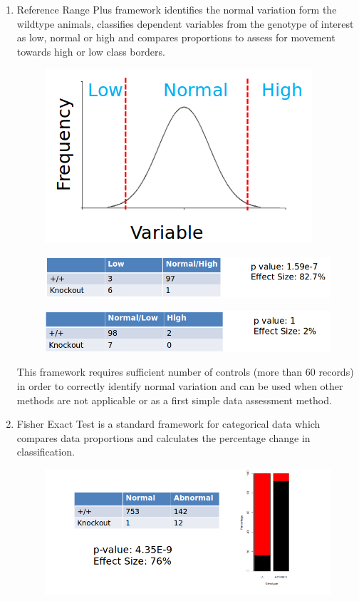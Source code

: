 \documentclass[12pt,a4paper]{article}
\begin{document}
\begin{enumerate}
\item Reference Range Plus framework identifies the normal variation form the wildtype animals, classifies dependent variables from the genotype of interest as low, normal or high and compares proportions to assess for movement towards high or low class borders.  
\begin{figure}[H]%
\centerline{\includegraphics[scale=0.4]{RR1_simple.png}}
\end{figure} 
\begin{figure}[H]%
\centerline{\includegraphics[scale=0.4]{RR2_1_simple.png}}
\end{figure}
\begin{figure}[H]%
\centerline{\includegraphics[scale=0.4]{RR2_2_simple.png}}
\end{figure}

This framework requires sufficient number of controls (more than 60 records) in order to correctly identify normal variation and can be used when other methods are not applicable or as a first simple data assessment method. 
\item Fisher Exact Test is a standard framework for categorical data which compares data proportions and calculates the percentage change in classification.
\begin{figure}[H]%
\centerline{\includegraphics[scale=0.4]{FE_simple.png}}
\end{figure}
\end{enumerate}
\end{document}
